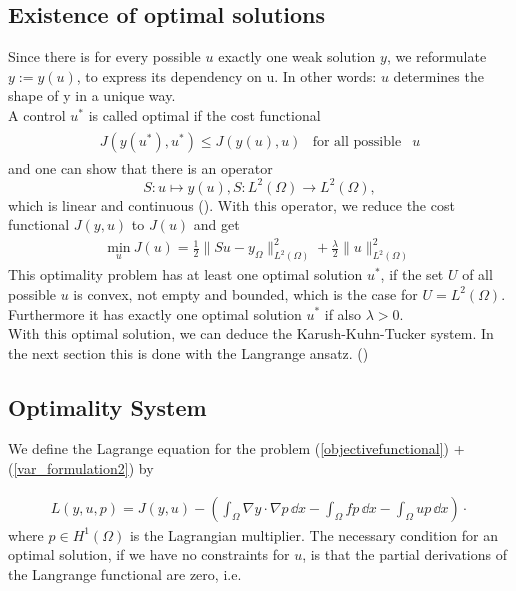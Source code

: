 \documentclass[a4paper, 11pt, twoside]{article}
\begin{document}
\subsection{Existence of optimal solutions}

Since there is for every possible $u$ exactly one weak solution $y$, we reformulate $y:= y(u)$, to express its dependency on u. In other words: $u$ determines the shape of y in a unique way. \\
A control $u^*$ is called optimal if the cost functional
\begin{eqnarray}\label{optimality_condition}
\begin{array}{rll}
J(y(u^*), u^*) \le J(y(u), u) & \text{for all possible} & u
\end{array}
\end{eqnarray}
and one can show that there is an operator 
\[
S: u \mapsto y(u), S:L^2(\Omega) \rightarrow L^2(\Omega),
\]
which is linear and continuous (\cite[Chap. 2.5.1]{troeltzsch}). With this operator, we reduce the cost functional $J(y , u)$ to $J(u)$ and get
\begin{eqnarray}\label{costfunctional_u}
 \underset{u}{\text{min}} ~J(u)=\frac{1}{2} \|Su-y_{\Omega}\|^2_{L^2(\Omega)}+\frac{\lambda}{2}\|u\|^2_{L^2(\Omega)}
\end{eqnarray}
This optimality problem has at least one optimal solution $u^*$, if the set $U$ of all possible $u$ is convex, not empty and bounded, which is the case for $U = L^2(\Omega)$. Furthermore it has exactly one optimal solution $u^*$ if also $\lambda > 0$. \\
With this optimal solution, we can deduce the Karush-Kuhn-Tucker system. In the next section this is done with the Langrange ansatz.
(\cite[Chap. 2.10]{troeltzsch})



\subsection{Optimality System}\label{sectionoptimalsystem}
We define the Lagrange equation for the problem (\ref{objectivefunctional}) + (\ref{var_formulation2}) by 

\begin{eqnarray}\label{Lagrange equation}
L(y,u,p) = J(y,u) - (\int_\Omega \nabla y\cdot \nabla p \, \dd x  - \int_\Omega f p \, \dd x - \int_\Omega u p\, \dd x) \cdot 
\end{eqnarray}
where $p \in H^1(\Omega)$ is the Lagrangian multiplier. The necessary condition for an optimal solution, if we have no constraints for $u$, is that the partial derivations of the Langrange functional are zero, i.e.
\end{document}
